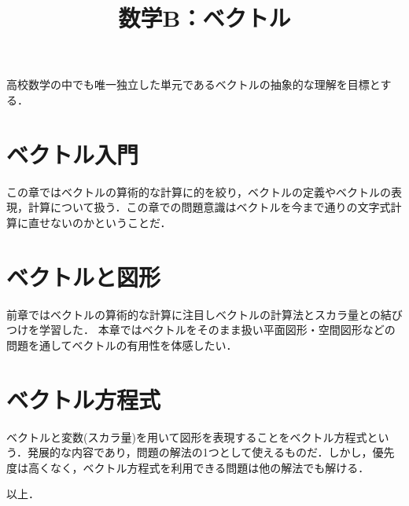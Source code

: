 \documentclass[dvipdfmx]{skreport}
\title{数学B：ベクトル}
\begin{document}
\maketitle
    高校数学の中でも唯一独立した単元であるベクトルの抽象的な理解を目標とする．\\
    \tableofcontents
    \newpage
    \chapter{ベクトル入門}
    この章ではベクトルの算術的な計算に的を絞り，ベクトルの定義やベクトルの表現，計算について扱う．この章での問題意識はベクトルを今まで通りの文字式計算に直せないのかということだ．
    
    


\newpage

    \chapter{ベクトルと図形}
    前章ではベクトルの算術的な計算に注目しベクトルの計算法とスカラ量との結びつけを学習した．
    本章ではベクトルをそのまま扱い平面図形・空間図形などの問題を通してベクトルの有用性を体感したい．
    
    

    \chapter{ベクトル方程式}
    ベクトルと変数(スカラ量)を用いて図形を表現することをベクトル方程式という．発展的な内容であり，問題の解法の1つとして使えるものだ．しかし，優先度は高くなく，ベクトル方程式を利用できる問題は他の解法でも解ける．
\newpage

    

    \vspace{5mm}
    以上．

    \newpage
    
\end{document}
